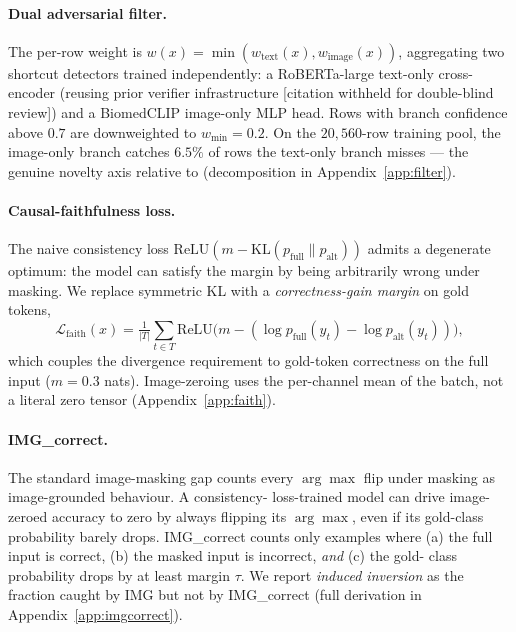 \documentclass{article}
\begin{document}
\paragraph{Dual adversarial filter.} The per-row weight is
$w(x) = \min(w_{\text{text}}(x), w_{\text{image}}(x))$, aggregating two
shortcut detectors trained independently: a RoBERTa-large text-only
cross-encoder (reusing prior verifier infrastructure [citation withheld
for double-blind review]) and a BiomedCLIP image-only MLP head. Rows
with branch confidence above $0.7$ are downweighted to $w_{\min} = 0.2$.
On the $20{,}560$-row training pool, the image-only branch catches
$6.5\%$ of rows the text-only branch misses --- the genuine novelty
axis relative to \citet{li2025sfc} (decomposition in
Appendix~\ref{app:filter}).

\paragraph{Causal-faithfulness loss.} The naive consistency loss
$\mathrm{ReLU}(m - \mathrm{KL}(p_{\mathrm{full}}\|p_{\mathrm{alt}}))$
admits a degenerate optimum: the model can satisfy the margin by being
arbitrarily wrong under masking. We replace symmetric KL with a
\emph{correctness-gain margin} on gold tokens,
\begin{equation}
\mathcal{L}_{\mathrm{faith}}(x) =
\tfrac{1}{|T|}\!\sum_{t \in T}\mathrm{ReLU}\!\bigl(m -
(\log p_{\mathrm{full}}(y_t) - \log p_{\mathrm{alt}}(y_t))\bigr),
\end{equation}
which couples the divergence requirement to gold-token correctness on
the full input ($m = 0.3$ nats). Image-zeroing uses the per-channel
mean of the batch, not a literal zero tensor (Appendix~\ref{app:faith}).

\paragraph{IMG\_correct.} The standard image-masking gap counts every
$\arg\max$ flip under masking as image-grounded behaviour. A consistency-
loss-trained model can drive image-zeroed accuracy to zero by always
flipping its $\arg\max$, even if its gold-class probability barely
drops. IMG\_correct counts only examples where (a) the full input is
correct, (b) the masked input is incorrect, \emph{and} (c) the gold-
class probability drops by at least margin $\tau$. We report
\emph{induced inversion} as the fraction caught by IMG but not by
IMG\_correct (full derivation in Appendix~\ref{app:imgcorrect}).
\end{document}

